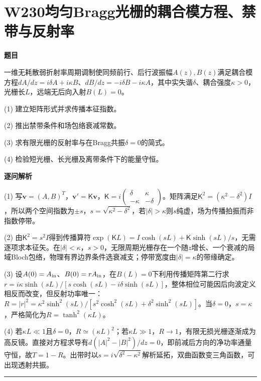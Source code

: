\documentclass[UTF8,a4paper,11pt,oneside,openany]{ctexbook}
\begin{document}
\section*{W230\quad 均匀Bragg光栅的耦合模方程、禁带与反射率}
\textbf{题目}\par
一维无耗散弱折射率周期调制使同频前行、后行波振幅$A(z),B(z)$满足耦合模方程$dA/dz=i\delta A+i\kappa B$、$dB/dz=-i\delta B-i\kappa A$，其中实失谐$\delta$、耦合强度$\kappa>0$，光栅长$L$，远端无后向入射$B(L)=0$。
\par\smallskip\noindent (1) 建立矩阵形式并求传播本征指数。
\par\smallskip\noindent (2) 推出禁带条件和场包络衰减常数。
\par\smallskip\noindent (3) 求有限光栅的反射率与在Bragg共振$\delta=0$的简式。
\par\smallskip\noindent (4) 检验短光栅、长光栅及离带条件下的能量守恒。
\par\medskip\textbf{逐问解析}\par
\par\smallskip\noindent (1) 写$\boldsymbol v=(A,B)^T$，$\boldsymbol v'=\mathsf K\boldsymbol v$，$\mathsf K=i\begin{pmatrix}\delta&\kappa\\-\kappa&-\delta\end{pmatrix}$。矩阵满足$\mathsf K^2=(\kappa^2-\delta^2)I$，所以两个空间指数为$\pm s$，$s=\sqrt{\kappa^2-\delta^2}$，若$|\delta|>\kappa$则$s$纯虚，场为传播拍振而非指数停带。
\par\smallskip\noindent (2) 由$\mathsf K^2=s^2I$得到传播算符$\exp(\mathsf KL)=I\cosh(sL)+\mathsf K\sinh(sL)/s$，无需逐项求本征矢。在$|\delta|<\kappa$，$s>0$，无限周期光栅存在一个随$z$增长、一个衰减的局域Bloch包络，物理有界边界条件选衰减支；停带宽度由$|\delta|=\kappa$的带缘确定。
\par\smallskip\noindent (3) 设$A(0)=A_{\rm in}$、$B(0)=rA_{\rm in}$，在$B(L)=0$下利用传播矩阵第二行求$r=i\kappa\sinh(sL)/[s\cosh(sL)-i\delta\sinh(sL)]$，整体相位可能因后向波定义相反而改变，但反射功率唯一：$R=|r|^2=\kappa^2\sinh^2(sL)/[s^2\cosh^2(sL)+\delta^2\sinh^2(sL)]$。当$\delta=0$，$s=\kappa$，严格简化为$R=\tanh^2(\kappa L)$。
\par\smallskip\noindent (4) 若$\kappa L\ll1$且$\delta=0$，$R\simeq(\kappa L)^2$；若$\kappa L\gg1$，$R\to1$，有限无损光栅逐渐成为高反镜。直接对方程求导有$d(|A|^2-|B|^2)/dz=0$，即前减后方向的净功率通量守恒，故$T=1-R$。出带时以$s=i\sqrt{\delta^2-\kappa^2}$解析延拓，双曲函数变三角函数，可出现透射共振。
\par\medskip\hrule\medskip
\end{document}
